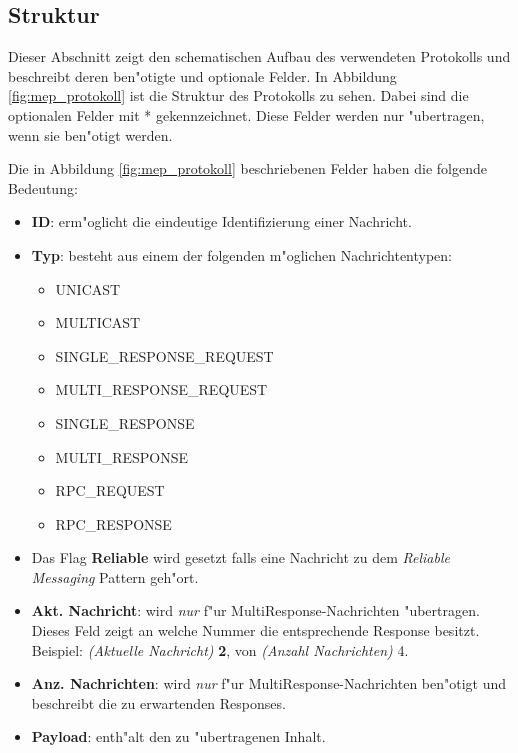 \subsection{Struktur}
Dieser Abschnitt zeigt den schematischen Aufbau des verwendeten Protokolls und beschreibt deren ben"otigte und optionale Felder. In Abbildung \ref{fig:mep_protokoll} ist die Struktur des Protokolls zu sehen. Dabei sind die optionalen Felder mit * gekennzeichnet. Diese Felder werden nur "ubertragen, wenn sie ben"otigt werden. 

Die in Abbildung \ref{fig:mep_protokoll} beschriebenen Felder haben die folgende Bedeutung: 

\begin{itemize}
\item {\bf ID}: erm"oglicht die eindeutige Identifizierung einer Nachricht.
\item {\bf Typ}: besteht aus einem der folgenden m"oglichen Nachrichtentypen:
\begin{itemize}
\item UNICAST
\item MULTICAST
\item SINGLE\_RESPONSE\_REQUEST
\item MULTI\_RESPONSE\_REQUEST
\item SINGLE\_RESPONSE
\item MULTI\_RESPONSE
\item RPC\_REQUEST
\item RPC\_RESPONSE
\end{itemize}
\item Das Flag {\bf Reliable} wird gesetzt falls eine Nachricht zu dem \emph{Reliable Messaging} Pattern geh"ort.
\item {\bf Akt. Nachricht}: wird \emph{nur} f"ur MultiResponse-Nachrichten "ubertragen. Dieses Feld zeigt an welche Nummer die entsprechende Response besitzt. Beispiel: \emph{(Aktuelle Nachricht)} {\bf 2}, von \emph{(Anzahl Nachrichten)} 4.
\item {\bf Anz. Nachrichten}: wird \emph{nur} f"ur MultiResponse-Nachrichten ben"otigt und beschreibt die zu erwartenden Responses. 
\item {\bf Payload}: enth"alt den zu "ubertragenen Inhalt.
\end{itemize}

